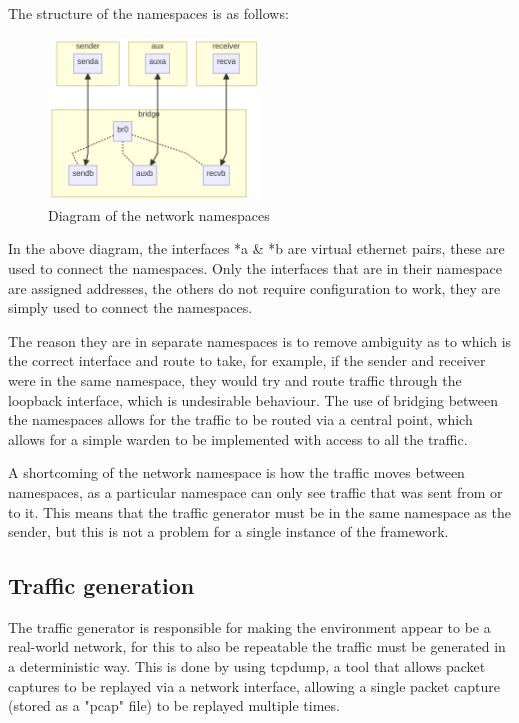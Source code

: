 The structure of the namespaces is as follows:

\begin{figure}[H]
    \centering
    \includegraphics[width=0.5\textwidth]{fig/namespace_setup.png}
    \caption{Diagram of the network namespaces}
    \label{fig:namespace_diagram}
\end{figure}

In the above diagram, the interfaces *a \& *b are virtual ethernet pairs, these are used to connect the namespaces. Only the interfaces that are in their namespace are assigned addresses, the others do not require configuration to work, they are simply used to connect the namespaces.

The reason they are in separate namespaces is to remove ambiguity as to which is the correct interface and route to take, for example, if the sender and receiver were in the same namespace, they would try and route traffic through the loopback interface, which is undesirable behaviour. The use of bridging between the namespaces allows for the traffic to be routed via a central point, which allows for a simple warden to be implemented with access to all the traffic.

A shortcoming of the network namespace is how the traffic moves between namespaces, as a particular namespace can only see traffic that was sent from or to it. This means that the traffic generator must be in the same namespace as the sender, but this is not a problem for a single instance of the framework.

\subsection{Traffic generation}

The traffic generator is responsible for making the environment appear to be a real-world network, for this to also be repeatable the traffic must be generated in a deterministic way. This is done by using tcpdump, a tool that allows packet captures to be replayed via a network interface, allowing a single packet capture (stored as a "pcap" file) to be replayed multiple times.

